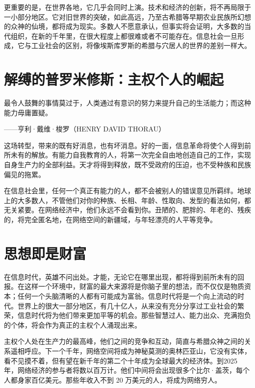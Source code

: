 更重要的是，在世界各地，它几乎会同时上演。技术和经济的创新，将不再局限于一小部分地区。它对旧世界的突破，如此高远，乃至古希腊等早期农业民族所幻想的众神的仙境，都将成为现实。多数人不愿意承认，但事实将会证明，大多数的当代组织，在新的千年里，在很大程度上都很难或者不可能存在。信息社会一旦形成，它与工业社会的区别，将像埃斯库罗斯的希腊与穴居人的世界的差别一样大。



\section{解缚的普罗米修斯：主权个人的崛起}

\begin{tcolorbox}
最令人鼓舞的事情莫过于，人类通过有意识的努力来提升自己的生活能力；而这种能力毋庸置疑。
\begin{flushright}
——亨利·戴维·梭罗（HENRY DAVID THORAU）
\end{flushright}
\end{tcolorbox}

这场转型，带来的既有好消息，也有坏消息。好的一面，信息革命将使个人得到前所未有的解放。有能力自我教育的人，将第一次完全自由地创造自己的工作，实现自身生产力的全部利益。天才将得到释放，既不受政府的压迫，也不受种族和民族偏见的拖累。


在信息社会里，任何一个真正有能力的人，都不会被别人的错误意见所羁绊。地球上的大多数人，不管他们对你的种族、长相、年龄、性取向、发型的看法如何，都无关紧要。在网络经济中，他们永远不会看到你。丑陋的、肥胖的、年老的、残疾的，将完全匿名地，在网络空间的新疆域，与年轻漂亮的人平等竞争。



\section{思想即是财富}
在信息时代，英雄不问出处。才能，无论它在哪里出现，都将得到前所未有的回报。在这样一个环境中，财富的最大来源将是你脑子里的想法，而不仅仅是物质资本；任何一个头脑清晰的人都有可能成为富翁。信息时代将是一个向上流动的时代。世界上的很大一部分地区，有几十亿人，从来没有充分分享过工业社会的繁荣，信息时代将为他们带来更加平等的机会。那些智慧过人、能力出众、充满抱负的个体，将会作为真正的主权个人涌现出来。


主权个人处在生产力的最高峰，他们之间的竞争和互动，简直与希腊众神之间的关系遥相呼应。下一个千年，网络空间将成为神秘莫测的奥林匹亚山，它没有实体，看不见摸不着，但有望在新千年的第二个十年成为全球最大的经济体。到2025 年，网络经济的参与者将数以百万计。他们中间将会出现很多个比尔·盖茨，每个人都身家百亿美元。那些年收入不到 20 万美元的人，将成为网络穷人。



